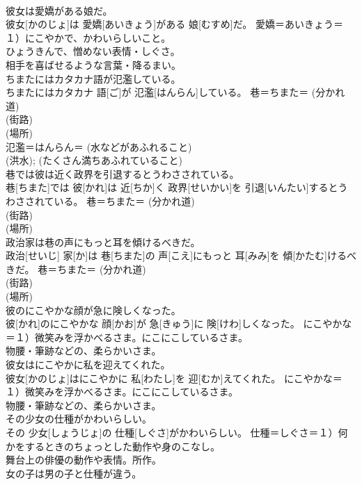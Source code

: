 \documentclass[8pt]{extreport}
\begin{document}
\begin{CJK}{UTF8}{min}
{\\	彼女は愛嬌がある娘だ。	
\\	彼女[かのじょ]は 愛嬌[あいきょう]がある 娘[むすめ]だ。	愛嬌＝あいきょう＝１）にこやかで、かわいらしいこと。 　　　　　　　　　
\\	ひょうきんで、憎めない表情・しぐさ。 　　　　　　　　　
\\	相手を喜ばせるような言葉・降るまい。
\\	ちまたにはカタカナ語が氾濫している。	
\\	ちまたにはカタカナ 語[ご]が 氾濫[はんらん]している。	巷＝ちまた＝ (分かれ道) 
\\	(街路) 
\\	(場所) 
\\	氾濫＝はんらん＝ (水などがあふれること) 
\\	(洪水); (たくさん満ちあふれていること) 
\\	巷では彼は近く政界を引退するとうわさされている。	
\\	巷[ちまた]では 彼[かれ]は 近[ちか]く 政界[せいかい]を 引退[いんたい]するとうわさされている。	巷＝ちまた＝ (分かれ道) 
\\	(街路) 
\\	(場所) 
\\	政治家は巷の声にもっと耳を傾けるべきだ。	
\\	政治[せいじ] 家[か]は 巷[ちまた]の 声[こえ]にもっと 耳[みみ]を 傾[かたむ]けるべきだ。	巷＝ちまた＝ (分かれ道) 
\\	(街路) 
\\	(場所) 
\\	彼のにこやかな顔が急に険しくなった。	
\\	彼[かれ]のにこやかな 顔[かお]が 急[きゅう]に 険[けわ]しくなった。	にこやかな＝１）微笑みを浮かべるさま。にこにこしているさま。 　　　　　　
\\	物腰・筆跡などの、柔らかいさま。
\\	彼女はにこやかに私を迎えてくれた。	
\\	彼女[かのじょ]はにこやかに 私[わたし]を 迎[むか]えてくれた。	にこやかな＝１）微笑みを浮かべるさま。にこにこしているさま。 　　　　　　
\\	物腰・筆跡などの、柔らかいさま。
\\	その少女の仕種がかわいらしい。	
\\	その 少女[しょうじょ]の 仕種[しぐさ]がかわいらしい。	仕種＝しぐさ＝１）何かをするときのちょっとした動作や身のこなし。 　　　　　　　
\\	舞台上の俳優の動作や表情。所作。
\\	女の子は男の子と仕種が違う。	
}
\end{CJK}
\end{document}
